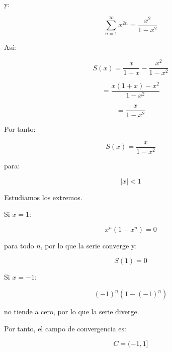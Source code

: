 \documentclass[fleqn]{article}
\begin{document}
	y:

	\[
	\sum_{n=1}^{\infty}x^{2n}
	=
	\frac{x^2}{1-x^2}
	\]

	Así:

	\[
	S(x)
	=
	\frac{x}{1-x}
	-
	\frac{x^2}{1-x^2}
	\]

	\[
	=
	\frac{x(1+x)-x^2}{1-x^2}
	\]

	\[
	=
	\frac{x}{1-x^2}
	\]

	Por tanto:

	\[
	\boxed{
	S(x)=\frac{x}{1-x^2}
	}
	\]

	para:

	\[
	|x|<1
	\]

	Estudiamos los extremos.

	Si $x=1$:

	\[
	x^n(1-x^n)=0
	\]

	para todo $n$, por lo que la serie converge y:

	\[
	S(1)=0
	\]

	Si $x=-1$:

	\[
	(-1)^n\left(1-(-1)^n\right)
	\]

	no tiende a cero, por lo que la serie diverge.

	Por tanto, el campo de convergencia es:

	\[
	\boxed{
	C=(-1,1]
	}
	\]
\end{document}

